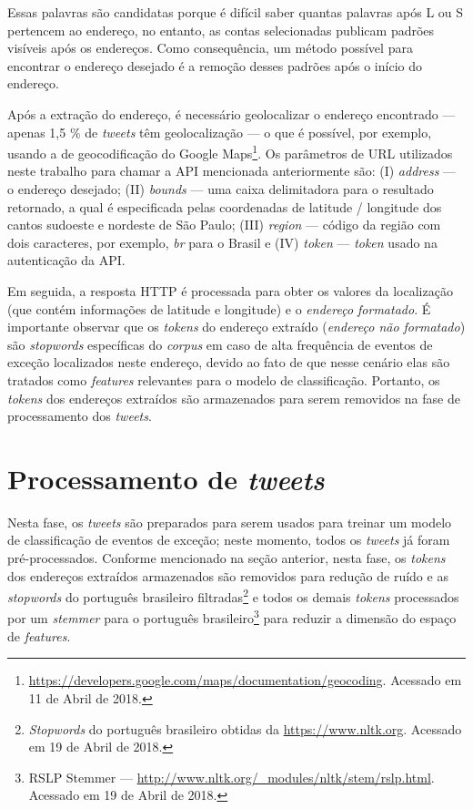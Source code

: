 \documentclass[
	12pt,				%
	oneside,			%
	a4paper,			%
	english,			%
	brazil				%
	]{abntex2ppgsi}
\begin{document}
{{Essas palavras são candidatas porque é difícil saber quantas palavras após L ou S pertencem ao endereço, no entanto, as contas selecionadas publicam padrões visíveis após os endereços. Como consequência, um método possível para encontrar o endereço desejado é a remoção desses padrões após o início do endereço.

Após a extração do endereço, é necessário geolocalizar o endereço encontrado --- apenas 1,5 \% de \textit {tweets} têm geolocalização \cite{niu2016community} --- o que é possível, por exemplo, usando a  de geocodificação do Google Maps\footnote {\url {https://developers.google.com/maps/documentation/geocoding}. Acessado em 11 de Abril de 2018.}. Os parâmetros de URL utilizados neste trabalho para chamar a API mencionada anteriormente são: (I) \emph {address} --- o endereço desejado; (II) \emph {bounds} --- uma caixa delimitadora para o resultado retornado, a qual é especificada pelas coordenadas de latitude / longitude dos cantos sudoeste e nordeste de São Paulo; (III) \emph {region} --- código da região com dois caracteres, por exemplo, \textit{br} para o Brasil e (IV) \emph {token} --- \textit{token} usado na autenticação da API.

Em seguida, a resposta HTTP é processada para obter os valores da localização (que contém informações de latitude e longitude) e o \emph{endereço formatado}. É importante observar que os \textit{tokens} do endereço extraído (\emph{endereço não formatado}) são \textit{stopwords} específicas do \textit{corpus} em caso de alta frequência de eventos de exceção localizados neste endereço, devido ao fato de que nesse cenário elas são tratados como \textit{features} relevantes para o modelo de classificação. Portanto, os \textit{tokens} dos endereços extraídos são armazenados para serem removidos na fase de processamento dos \textit{tweets}.

\section{Processamento de \textit{tweets}}
\label{processing}

Nesta fase, os \textit {tweets} são preparados para serem usados para treinar um modelo de classificação de eventos de exceção; neste momento, todos os \textit {tweets} já foram pré-processados. Conforme mencionado na seção anterior, nesta fase, os \textit{tokens} dos endereços extraídos armazenados são removidos para redução de ruído e as \textit{stopwords} do português brasileiro filtradas\footnote{\textit{Stopwords} do português brasileiro obtidas da  \url{https://www.nltk.org}. Acessado em 19 de Abril de 2018.} e todos os demais \textit{tokens}  processados por um \textit{stemmer} para o  português brasileiro\footnote{RSLP Stemmer --- \url {http://www.nltk.org/\_modules/nltk/stem/rslp.html}. Acessado em 19 de Abril de 2018.} para reduzir a dimensão do espaço de \textit{features}.

}}
\end{document}
